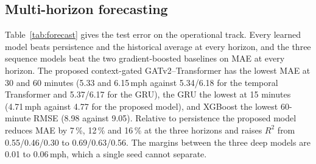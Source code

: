 \subsection{Multi-horizon forecasting}
Table~\ref{tab:forecast} gives the test error on the operational track. Every learned model beats persistence and the
historical average at every horizon, and the three sequence models beat the two gradient-boosted baselines on MAE
at every horizon. The proposed context-gated GATv2--Transformer has the lowest MAE at 30 and 60 minutes (5.33 and
6.15\,mph against 5.34/6.18 for the temporal Transformer and 5.37/6.17 for the GRU), the GRU the lowest at 15
minutes (4.71\,mph against 4.77 for the proposed model), and XGBoost the lowest 60-minute RMSE (8.98 against 9.05).
Relative to persistence the proposed model reduces MAE by 7\,\%, 12\,\% and 16\,\% at the three horizons and raises
$R^2$ from 0.55/0.46/0.30 to 0.69/0.63/0.56. The margins between the three deep models are 0.01 to 0.06\,mph, which
a single seed cannot separate.

